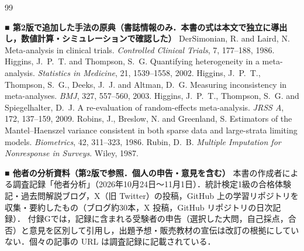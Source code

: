 \begin{thebibliography}{99}
\item[] \textbf{■ 第2版で追加した手法の原典（書誌情報のみ．本書の式は本文で独立に導出し，数値計算・シミュレーションで確認した）}
 DerSimonian, R. and Laird, N. Meta-analysis in clinical trials. \textit{Controlled Clinical Trials}, 7, 177--188, 1986.
 Higgins, J.~P.~T. and Thompson, S.~G. Quantifying heterogeneity in a meta-analysis. \textit{Statistics in Medicine}, 21, 1539--1558, 2002.
 Higgins, J.~P.~T., Thompson, S.~G., Deeks, J.~J. and Altman, D.~G. Measuring inconsistency in meta-analyses. \textit{BMJ}, 327, 557--560, 2003.
 Higgins, J.~P.~T., Thompson, S.~G. and Spiegelhalter, D.~J. A re-evaluation of random-effects meta-analysis. \textit{JRSS A}, 172, 137--159, 2009.
 Robins, J., Breslow, N. and Greenland, S. Estimators of the Mantel--Haenszel variance consistent in both sparse data and large-strata limiting models. \textit{Biometrics}, 42, 311--323, 1986.
 Rubin, D.~B. \textit{Multiple Imputation for Nonresponse in Surveys}. Wiley, 1987.

\item[] \textbf{■ 他者の分析資料（第2版で参照．個人の申告・意見を含む）}
 本書の作成者による調査記録「他者分析」（2026年10月24日〜11月1日）．統計検定1級の合格体験記・過去問解説ブログ，X（旧 Twitter）の投稿，GitHub 上の学習リポジトリを収集・要約したもの（ブログ約30本，X 投稿，GitHub リポジトリの日次記録）．
      付録Gでは，記録に含まれる受験者の申告（選択した大問，自己採点，合否）と意見を区別して引用し，出題予想・販売教材の宣伝は改訂の根拠にしていない．個々の記事の URL は調査記録に記載されている．
\end{thebibliography}
